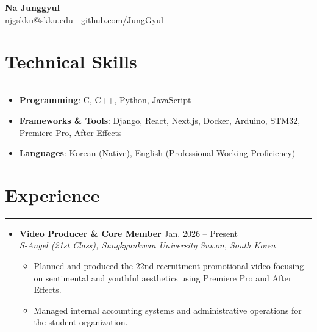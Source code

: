 \documentclass[letterpaper, 10pt]{article}
\begin{document}
\begin{center}
    \textbf{\LARGE Na Junggyul} \\ \vspace{2pt}
    \href{mailto:njgskku@skku.edu}{\underline{njgskku@skku.edu}} $|$ 
    \href{https://github.com/JungGyul}{\underline{github.com/JungGyul}}
\end{center}

\section*{Technical Skills}
\hrule
\vspace{4pt}
\begin{itemize}
    \item[] \textbf{Programming}: C, C++, Python, JavaScript
    \item[] \textbf{Frameworks \& Tools}: Django, React, Next.js, Docker, Arduino, STM32, Premiere Pro, After Effects
    \item[] \textbf{Languages}: Korean (Native), English (Professional Working Proficiency)
\end{itemize}

\section*{Experience}
\hrule
\vspace{4pt}
\begin{itemize}
    \item 
    \textbf{Video Producer \& Core Member} \hfill Jan. 2026 -- Present \\
    \textit{S-Angel (21st Class), Sungkyunkwan University} \hfill \textit{Suwon, South Korea}
    \begin{itemize}
        \item Planned and produced the 22nd recruitment promotional video focusing on sentimental and youthful aesthetics using Premiere Pro and After Effects.
        \item Managed internal accounting systems and administrative operations for the student organization.
    \end{itemize}
\end{itemize}

\end{document}
